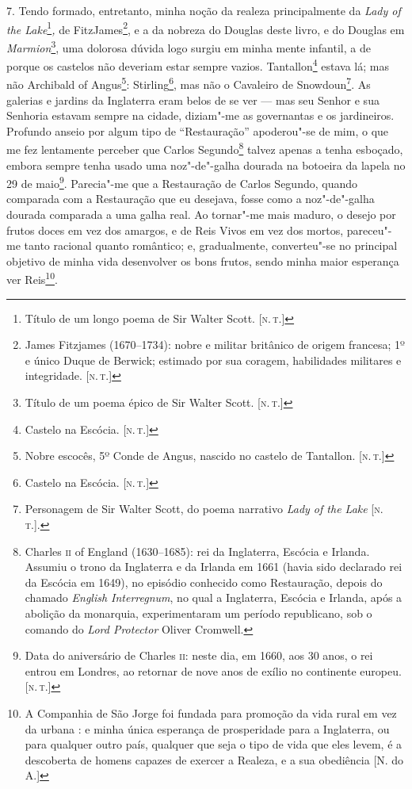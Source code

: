 7. Tendo formado, entretanto, minha noção da realeza principalmente da
\emph{Lady of the Lake}\footnote{Título de um longo poema de Sir Walter
  Scott. {[}\textsc{n.\,t.}{]}}\emph{,} de FitzJames\footnote{James Fitzjames
  (1670--1734): nobre e militar britânico de origem francesa; 1º e único
  Duque de Berwick; estimado por sua coragem, habilidades militares e
  integridade. {[}\textsc{n.\,t.}{]}}, e a da nobreza do Douglas deste livro, e
do Douglas em \emph{Marmion}\footnote{Título de um poema épico de Sir
  Walter Scott. {[}\textsc{n.\,t.}{]}}, uma dolorosa dúvida logo surgiu
em minha mente infantil, a de porque os castelos não deveriam estar
sempre vazios. Tantallon\footnote{Castelo na Escócia. {[}\textsc{n.\,t.}{]}}
estava lá; mas não Archibald of Angus\footnote{Nobre escocês, 5º Conde
  de Angus, nascido no castelo de Tantallon. {[}\textsc{n.\,t.}{]}}:
Stirling\footnote{Castelo na Escócia. {[}\textsc{n.\,t.}{]}}, mas não o
Cavaleiro de Snowdoun\footnote{Personagem de Sir Walter Scott, do poema
  narrativo \emph{Lady of the Lake} {[}\textsc{n.\,t.}{]}.}. As galerias e
jardins da Inglaterra eram belos de se ver --- mas seu Senhor e sua
Senhoria estavam sempre na cidade, diziam"-me as governantas e os
jardineiros. Profundo anseio por algum tipo de ``Restauração''
apoderou"-se de mim, o que me fez lentamente perceber que Carlos
Segundo\footnote{Charles \textsc{ii} of England (1630--1685): rei da Inglaterra,
  Escócia e Irlanda. Assumiu o trono da Inglaterra e da Irlanda em 1661
  (havia sido declarado rei da Escócia em 1649), no episódio conhecido
  como Restauração, depois do chamado \emph{English Interregnum}, no
  qual a Inglaterra, Escócia e Irlanda, após a abolição da monarquia,
  experimentaram um período republicano, sob o comando do \emph{Lord
  Protector} Oliver Cromwell.} talvez apenas a tenha esboçado, embora
sempre tenha usado uma noz"-de"-galha dourada na botoeira da lapela no 29
de maio\footnote{Data do aniversário de Charles \textsc{ii}: neste dia, em 1660,
  aos 30 anos, o rei entrou em Londres, ao retornar de nove anos de
  exílio no continente europeu. {[}\textsc{n.\,t.}{]}}. Parecia"-me que a
Restauração de Carlos Segundo, quando comparada com a Restauração que eu
desejava, fosse como a noz"-de"-galha dourada comparada a uma galha real.
Ao tornar"-me mais maduro, o desejo por frutos doces em vez dos amargos,
e de Reis Vivos em vez dos mortos, pareceu"-me tanto racional quanto
romântico; e, gradualmente, converteu"-se no principal objetivo de minha
vida desenvolver os bons frutos, sendo minha maior esperança ver
Reis\footnote{A Companhia de São Jorge foi fundada para promoção da vida
  rural em vez da urbana : e minha única esperança de prosperidade para
  a Inglaterra, ou para qualquer outro país, qualquer que seja o tipo de
  vida que eles levem, é a descoberta de homens capazes de exercer a
  Realeza, e a sua obediência {[}N. do A.{]}}.

